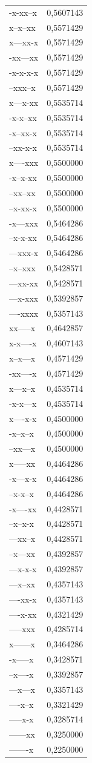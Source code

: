 \documentclass[
  letterpaper,
  DIV=11,
  numbers=noendperiod]{scrreprt}
\begin{document}
\begin{longtable*}{lr}
-x-xx--x & 0,5607143 \\ 
x--x--xx & 0,5571429 \\ 
x---xx-x & 0,5571429 \\ 
-xx---xx & 0,5571429 \\ 
-x-x-x-x & 0,5571429 \\ 
--xxx--x & 0,5571429 \\ 
x---x-xx & 0,5535714 \\ 
-x-x--xx & 0,5535714 \\ 
-x--xx-x & 0,5535714 \\ 
--xx-x-x & 0,5535714 \\ 
x----xxx & 0,5500000 \\ 
-x--x-xx & 0,5500000 \\ 
--xx--xx & 0,5500000 \\ 
--x-xx-x & 0,5500000 \\ 
-x---xxx & 0,5464286 \\ 
--x-x-xx & 0,5464286 \\ 
---xxx-x & 0,5464286 \\ 
--x--xxx & 0,5428571 \\ 
---xx-xx & 0,5428571 \\ 
---x-xxx & 0,5392857 \\ 
----xxxx & 0,5357143 \\ 
xx-----x & 0,4642857 \\ 
x-x----x & 0,4607143 \\ 
x--x---x & 0,4571429 \\ 
-xx----x & 0,4571429 \\ 
x---x--x & 0,4535714 \\ 
-x-x---x & 0,4535714 \\ 
x----x-x & 0,4500000 \\ 
-x--x--x & 0,4500000 \\ 
--xx---x & 0,4500000 \\ 
x-----xx & 0,4464286 \\ 
-x---x-x & 0,4464286 \\ 
--x-x--x & 0,4464286 \\ 
-x----xx & 0,4428571 \\ 
--x--x-x & 0,4428571 \\ 
---xx--x & 0,4428571 \\ 
--x---xx & 0,4392857 \\ 
---x-x-x & 0,4392857 \\ 
---x--xx & 0,4357143 \\ 
----xx-x & 0,4357143 \\ 
----x-xx & 0,4321429 \\ 
-----xxx & 0,4285714 \\ 
x------x & 0,3464286 \\ 
-x-----x & 0,3428571 \\ 
--x----x & 0,3392857 \\ 
---x---x & 0,3357143 \\ 
----x--x & 0,3321429 \\ 
-----x-x & 0,3285714 \\ 
------xx & 0,3250000 \\ 
-------x & 0,2250000 \\ 
\bottomrule
\end{longtable*}
\end{document}
